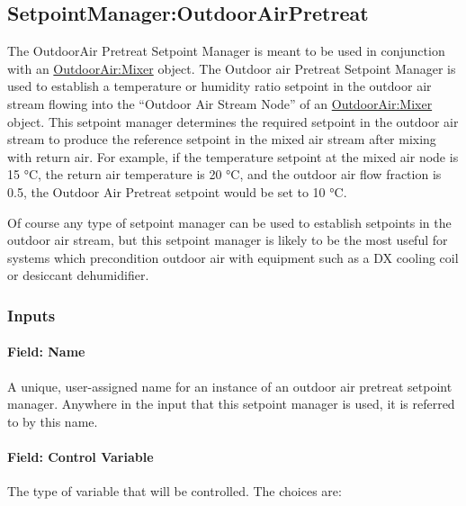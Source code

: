 \subsection{SetpointManager:OutdoorAirPretreat}\label{setpointmanageroutdoorairpretreat}

The OutdoorAir Pretreat Setpoint Manager is meant to be used in conjunction with an \hyperref[outdoorairmixer]{OutdoorAir:Mixer} object. The Outdoor air Pretreat Setpoint Manager is used to establish a temperature or humidity ratio setpoint in the outdoor air stream flowing into the ``Outdoor Air Stream Node'' of an \hyperref[outdoorairmixer]{OutdoorAir:Mixer} object. This setpoint manager determines the required setpoint in the outdoor air stream to produce the reference setpoint in the mixed air stream after mixing with return air. For example, if the temperature setpoint at the mixed air node is 15 °C, the return air temperature is 20 °C, and the outdoor air flow fraction is 0.5, the Outdoor Air Pretreat setpoint would be set to 10 °C.

Of course any type of setpoint manager can be used to establish setpoints in the outdoor air stream, but this setpoint manager is likely to be the most useful for systems which precondition outdoor air with equipment such as a DX cooling coil or desiccant dehumidifier.

\subsubsection{Inputs}\label{inputs-9-020}

\paragraph{Field: Name}\label{field-name-9-016}

A unique, user-assigned name for an instance of an outdoor air pretreat setpoint manager. Anywhere in the input that this setpoint manager is used, it is referred to by this name.

\paragraph{Field: Control Variable}\label{field-control-variable-9}

The type of variable that will be controlled. The choices are:

